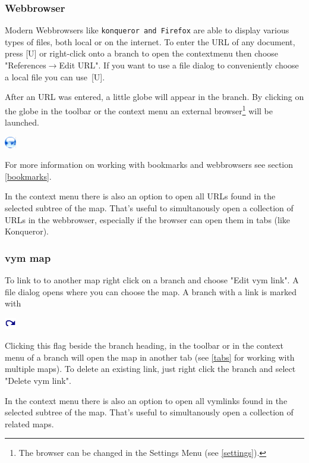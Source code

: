 \documentclass[12pt,a4paper]{article}
\newcommand{\vym}{{\sc vym }}
\newcommand{\ra}{$\longrightarrow$}
\newcommand{\key}[1]{[#1]}
\begin{document}
\subsubsection*{Webbrowser}
Modern Webbrowsers like {\tt konqueror and Firefox} are able to display various
types of files, both local or on the internet. To enter the URL of
any document, press \key{U} or right-click  onto a branch to open the contextmenu then choose
"References\ra Edit URL". If you want to use a file dialog to
conveniently choose a local file you can use~\key{U}.

After an URL was entered, a little globe will appear in the branch. By
clicking on the globe in the toolbar or the context menu an external
browser\footnote{
    The browser can be changed in the Settings Menu (see \ref{settings}).}
will be launched.
\begin{center}
    \includegraphics[width=0.5cm]{images/flag-url.png}
\end{center}
For more information on working with bookmarks and webbrowsers see
section \ref{bookmarks}.

In the context menu there is also an option to open all URLs found
in the selected subtree of the map. That's useful to simultanously open
a collection of URLs in the webbrowser, especially if the browser can
open them in tabs (like Konqueror).


\subsubsection*{\vym map}
To link to to another map right click on a branch and choose "Edit \vym link". A file dialog opens where you can choose the map. A
branch with a link is marked with 
\begin{center}
    \includegraphics[width=0.5cm]{images/flag-vymlink.png}
\end{center}
Clicking this flag beside the branch heading, in the toolbar or in the context menu of a branch will open the map in another tab (see \ref{tabs} for working with
multiple maps). To delete an existing link, just right click the branch and select "Delete \vym link".

In the context menu there is also an option to open all vymlinks found
in the selected subtree of the map. That's useful to simultanously open
a collection of related maps.
\end{document}

